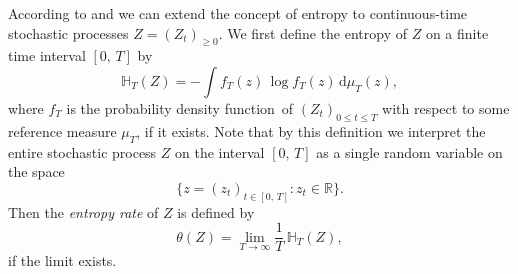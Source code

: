 \documentclass[smallextended]{svjour3}
\newcommand{\R}{\mathbb{R}}
\newcommand{\N}{\mathbb{N}}
\newcommand{\E}{\mathbb{E}}
\renewcommand{\H}{\mathbb{H}}
\newcommand{\liml}{\lim\limits}
\newcommand{\dd}[1]{\,\mathrm{d}#1}
\newcommand{\pdf}{probability density function}
\begin{document}
% 
% 
% 

According to \citet{Dumitrescu1988MICAS} and \citet{Girardin2003JAP} we can extend the concept of entropy to continuous-time stochastic processes $Z=(Z_t)_{\geq0}$.
We first define the entropy of $Z$ on a finite time interval $[0,\,T]$ by
\begin{equation*}
  \H_T(Z) = - \int f_T(z)\,\log f_T(z)\dd{\mu_T(z)},	 
\end{equation*}
where $f_T$ is the \pdf\ of $(Z_t)_{0\leq t\leq T}$ with respect to some reference measure $\mu_T$, if it exists.
Note that by this definition we interpret the entire stochastic process $Z$ on the interval $[0,\,T]$ as a single random variable on the space
\begin{equation*}
  \{z=(z_t)_{t\in[0,\,T]}: z_t\in\R\}.
\end{equation*}
Then the \emph{entropy rate} of $Z$ is defined by
\begin{equation*}
	\theta(Z) = \liml_{T\to\infty} \frac{1}{T}\,\H_T(Z),
\end{equation*}
if the limit exists.
\end{document}
